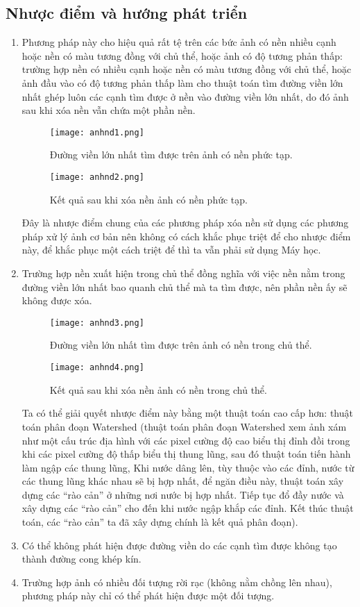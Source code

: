 \documentclass[conference]{IEEEtran}
\begin{document}
 \subsection{Nhược điểm và hướng phát triển}
 \begin{enumerate}
     \item Phương pháp này cho hiệu quả rất tệ trên các bức ảnh có nền nhiều cạnh hoặc nền có màu tương đồng với chủ thể, hoặc ảnh có độ tương phản thấp: trường hợp nền có nhiều cạnh hoặc nền có màu tương đồng với chủ thể, hoặc ảnh đầu vào có độ tương phản thấp làm cho thuật toán tìm đường viền lớn nhất ghép luôn các cạnh tìm được ở nền vào đường viền lớn nhất, do đó ảnh sau khi xóa nền vẫn chứa một phần nền.
\begin{figure}[!htb]
\centerline{\texttt{[image: anhnd1.png]}}
\caption{Đường viền lớn nhất tìm được trên ảnh có nền phức tạp.}
\label{fig}
\end{figure}
 \FloatBarrier
 \begin{figure}[!htb]
\centerline{\texttt{[image: anhnd2.png]}}
\caption{Kết quả sau khi xóa nền ảnh có nền phức tạp.}
\label{fig}
\end{figure}
 \FloatBarrier
  Đây là nhược điểm chung của các phương pháp xóa nền sử dụng các phương pháp xử lý ảnh cơ bản nên không có cách khắc phục triệt để cho nhược điểm này, để khắc phục một cách triệt để thì ta vẫn phải sử dụng Máy học.
\item Trường hợp nền xuất hiện trong chủ thể đồng nghĩa với việc nền nằm trong đường viền lớn nhất bao quanh chủ thể mà ta tìm được, nên phần nền ấy sẽ không được xóa.
 \begin{figure}[!htb]
\centerline{\texttt{[image: anhnd3.png]}}
\caption{Đường viền lớn nhất tìm được trên ảnh có nền trong chủ thể.}
\label{fig}
\end{figure}
 \FloatBarrier
 \begin{figure}[!htb]
\centerline{\texttt{[image: anhnd4.png]}}
\caption{Kết quả sau khi xóa nền ảnh có nền trong chủ thể.}
\label{fig}
\end{figure}
 \FloatBarrier
Ta có thể giải quyết nhược điểm này bằng một thuật toán cao cấp hơn: thuật toán phân đoạn Watershed (thuật toán phân đoạn Watershed xem ảnh xám như một cấu trúc địa hình với các pixel cường độ cao
biểu thị đỉnh đồi trong khi các pixel cường độ thấp biểu thị thung lũng, sau đó thuật toán tiến hành làm ngập các thung lũng, Khi nước dâng lên, tùy thuộc vào các đỉnh, nước từ các thung lũng khác nhau sẽ bị hợp nhất, để ngăn điều này, thuật toán xây dựng các “rào cản” ở những nơi nước bị hợp nhất. Tiếp tục đổ đầy nước và xây dựng các “rào cản” cho đến khi nước ngập khắp các đỉnh. Kết thúc thuật toán, các “rào cản” ta đã xây dựng chính là kết quả phân đoạn).
\item Có thể không phát hiện được đường viền do các cạnh tìm được không tạo thành đường cong khép kín.
\item Trường hợp ảnh có nhiều đối tượng rời rạc (không nằm chồng lên nhau), phương pháp này chỉ có thể phát hiện được một đối tượng.
 \end{enumerate}
\end{document}
